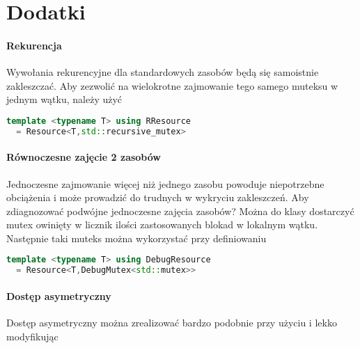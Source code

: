 \section{Dodatki}\label{sec:extras}

\paragraph{Rekurencja}
Wywołania rekurencyjne dla standardowych zasobów będą się samoistnie zakleszczać. Aby zezwolić na wielokrotne zajmowanie tego samego muteksu w jednym wątku, należy użyć 
\begin{lstlisting}[language=C++,style=cpp-style,aboveskip=2mm]
  template <typename T> using RResource
  = Resource<T,std::recursive_mutex>
\end{lstlisting}

\paragraph{Równoczesne zajęcie 2 zasobów}
Jednoczesne zajmowanie więcej niż jednego zasobu powoduje niepotrzebne obciążenia i może prowadzić do trudnych w wykryciu zakleszczeń. Aby zdiagnozować podwójne jednoczesne zajęcia zasobów? Można do klasy  dostarczyć mutex owinięty w licznik ilości zastosowanych blokad w lokalnym wątku.
Następnie taki muteks można wykorzystać przy definiowaniu
\begin{lstlisting}[language=C++,style=cpp-style,aboveskip=2mm]
  template <typename T> using DebugResource
  = Resource<T,DebugMutex<std::mutex>>
\end{lstlisting}

\paragraph{Dostęp asymetryczny}
Dostęp asymetryczny można zrealizować bardzo podobnie przy użyciu  i lekko modyfikując 
